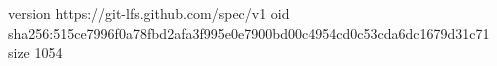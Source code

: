 version https://git-lfs.github.com/spec/v1
oid sha256:515ce7996f0a78fbd2afa3f995e0e7900bd00c4954cd0c53cda6dc1679d31c71
size 1054
